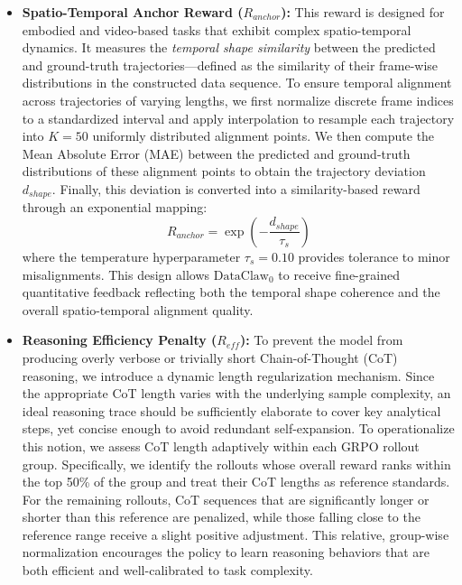 \documentclass{llmxive}
\begin{document}
\begin{itemize}[leftmargin=20pt, labelsep=4pt]
\item \textbf{Spatio-Temporal Anchor Reward (\(R_{anchor}\)):} 
This reward is designed for embodied and video-based tasks that exhibit complex spatio-temporal dynamics. 
It measures the \textit{temporal shape similarity} between the predicted and ground-truth trajectories—defined as the similarity of their frame-wise distributions in the constructed data sequence. 
To ensure temporal alignment across trajectories of varying lengths, we first normalize discrete frame indices to a standardized interval and apply interpolation to resample each trajectory into \(K = 50\) uniformly distributed alignment points. 
We then compute the Mean Absolute Error (MAE) between the predicted and ground-truth distributions of these alignment points to obtain the trajectory deviation \(d_{shape}\). 
Finally, this deviation is converted into a similarity-based reward through an exponential mapping:
\begin{equation}
R_{anchor} = \exp\left(-\frac{d_{shape}}{\tau_s}\right)
\end{equation}
where the temperature hyperparameter \(\tau_s = 0.10\) provides tolerance to minor misalignments. 
This design allows $\text{DataClaw}_0$ to receive fine-grained quantitative feedback reflecting both the temporal shape coherence and the overall spatio-temporal alignment quality.

    

\item \textbf{Reasoning Efficiency Penalty (\(R_{eff}\)):} 
To prevent the model from producing overly verbose or trivially short Chain-of-Thought (CoT) reasoning, we introduce a dynamic length regularization mechanism. 
Since the appropriate CoT length varies with the underlying sample complexity, an ideal reasoning trace should be sufficiently elaborate to cover key analytical steps, yet concise enough to avoid redundant self-expansion. 
To operationalize this notion, we assess CoT length adaptively within each GRPO rollout group. 
Specifically, we identify the rollouts whose overall reward ranks within the top 50\% of the group and treat their CoT lengths as reference standards. 
For the remaining rollouts, CoT sequences that are significantly longer or shorter than this reference are penalized, while those falling close to the reference range receive a slight positive adjustment. 
This relative, group-wise normalization encourages the policy to learn reasoning behaviors that are both efficient and well-calibrated to task complexity.
    
\end{itemize}
\end{document}
